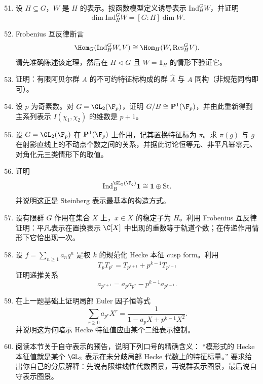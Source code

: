 \begin{enumerate}[label={\textbf{习题8.\arabic*.}}, wide=0pt, leftmargin=3.2em]
\setcounter{enumi}{50}

\item \hard 设 $H\subseteq G$，$W$ 是 $H$ 的表示。按函数模型定义诱导表示 $\mathrm{Ind}_H^G W$，并证明
\[
\dim \mathrm{Ind}_H^G W=[G:H]\dim W.
\]

\item \hard Frobenius 互反律断言
\[
\Hom_G(\mathrm{Ind}_H^G W,V)\cong \Hom_H(W,\mathrm{Res}_H^G V).
\]
请先准确陈述该定理，然后在 $H\triangleleft G$ 且 $W=\mathbf{1}_H$ 的情形下验证它。

\item \hard 证明：有限阿贝尔群 $A$ 的不可约特征标构成的群 $\widehat{A}$ 与 $A$ 同构（非规范同构即可）。

\item \hard 设 $p$ 为奇素数。对 $G=\GL_2(\F_p)$，证明 $G/B\cong \mathbf{P}^1(\F_p)$，并由此重新得到主系列表示 $I(\chi_1,\chi_2)$ 的维数是 $p+1$。

\item \hard 设 $G=\GL_2(\F_p)$ 在 $\mathbf{P}^1(\F_p)$ 上作用，记其置换特征标为 $\pi$。求 $\pi(g)$ 与 $g$ 在射影直线上的不动点个数之间的关系，并据此讨论恒等元、非平凡幂零元、对角化元三类情形下的取值。

\item \hard 证明
\[
\mathrm{Ind}_B^{\GL_2(\F_q)}\mathbf{1}\cong \mathbf{1}\oplus \mathrm{St}.
\]
并说明这正是 Steinberg 表示最基本的构造方式。

\item \hard 设有限群 $G$ 作用在集合 $X$ 上，$x\in X$ 的稳定子为 $H$。利用 Frobenius 互反律证明：平凡表示在置换表示 $\C[X]$ 中出现的重数等于轨道个数；在传递作用情形下它恰出现一次。

\item \hard 设 $f=\sum_{n\ge 1}a_nq^n$ 是权 $k$ 的规范化 Hecke 本征 cusp form。利用
\[
T_pT_{p^r}=T_{p^{r+1}}+p^{k-1}T_{p^{r-1}}
\]
证明递推关系
\[
a_{p^{r+1}}=a_pa_{p^r}-p^{k-1}a_{p^{r-1}}.
\]

\item \hard 在上一题基础上证明局部 Euler 因子恒等式
\[
\sum_{r\ge 0}a_{p^r}X^r=\frac{1}{1-a_pX+p^{k-1}X^2}.
\]
并说明这为何暗示 Hecke 特征值应由某个二维表示控制。

\item \hard 阅读本节关于自守表示的预告，说明下列口号的精确含义：
“模形式的 Hecke 本征值就是某个 $\GL_2$ 表示在未分歧局部 Hecke 代数上的特征标量。”
要求给出你自己的分层解释：先说有限维线性代数图景，再说群表示图景，最后说自守表示图景。
\end{enumerate}

